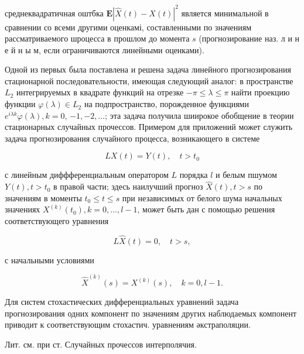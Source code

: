 \documentclass[10pt]{article}
\begin{document}
среднеквадратичная оштбка $\mathbf{E}|\hat{X}(t)-X(t)|^{2}$ является минимальной в сравнении со всеми другими оценкамі, составленными по значениям рассматриваемого шроцесса в прошлом до момента $s$ (прогнозирование наз. л и н е й н ы м, если ограничиваются линейными оценками).



Одной из первых была поставлена и решена задача линейного прогнозирования стационарной последовательности, имеющая следующий аналог: в пространстве $L_{2}$ интегрируемых в квадрате функций на отрезке $-\pi \leqslant \lambda \leqslant \pi$ найти проекцию функции $\varphi(\lambda) \in L_{2}$ на подпространство, порожденное функциями $e^{i \lambda k} \varphi(\lambda), k=0$, $-1,-2, \ldots$; эта задача получила шиирокое обобщение в теории стационарных случайных прочессов. Примером для приложений может служить задача прогнозирования случайного процесса, возникающего в системе



\[

L X(t)=Y(t), \quad t>t_{0}

\]



с линейным диффференциальным оператором $L$ порядка $l$ и белым пшумом $Y(t), t>t_{0}$ в правой части; здесь наилучший прогноз $\hat{X}(t), t>s$ по значениям в моменты $t_{0} \leqslant t \leqslant s$ при независимых от белого шума начальных значениях $X^{(k)}\left(t_{0}\right), k=0, \ldots, l-1$, может быть дан с помощью решения соответствующего уравнения



\[

L \hat{X}(t)=0, \quad t>s,

\]



с начальными условиями



\[

\widehat{X}^{(k)}(s)=X^{(k)}(s), \quad k=0, l-1 .

\]



Для систем стохастических дифференциальных уравнений задача прогнозирования одних компонент по значениям других наблюдаемых компонент приводит к соответствующим стохастич. уравнениям әкстраполяции.



Лит. см. при ст. Случайных прочессов интерполячия.
\end{document}

